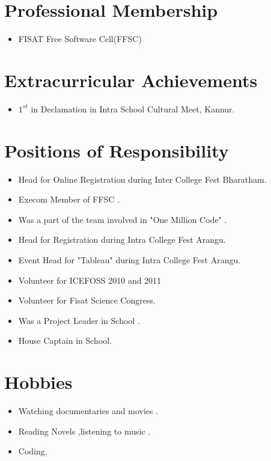 \documentclass[a4paper]{article}
\begin{document}
\section{Professional Membership}
\begin{itemize}
\item FISAT Free Software Cell(FFSC)
\end{itemize}


\section{Extracurricular Achievements}
\begin{itemize}
\item $ 1^{st} $ in Declamation in Intra School Cultural Meet, Kannur.
\end{itemize}

\section{Positions of Responsibility}
\begin{itemize}
\item	Head for Online Registration during Inter College Fest Bharatham.
\item	Execom Member of FFSC .
\item	Was a part of the team involved in "One Million Code" .
\item	Head for Registration during Intra College Fest Arangu.
\item	Event Head for "Tableau" during Intra College Fest Arangu.
\item	Volunteer for ICEFOSS 2010 and 2011
\item	Volunteer for Fisat Science Congress.
\item	Was a Project Leader in School .
\item	House Captain in School.

\end{itemize}

\section{Hobbies}
\begin{itemize}
\item	Watching documentaries and movies .
\item	Reading Novels ,listening to music .
\item	Coding.
\end{itemize}
\end{document}
